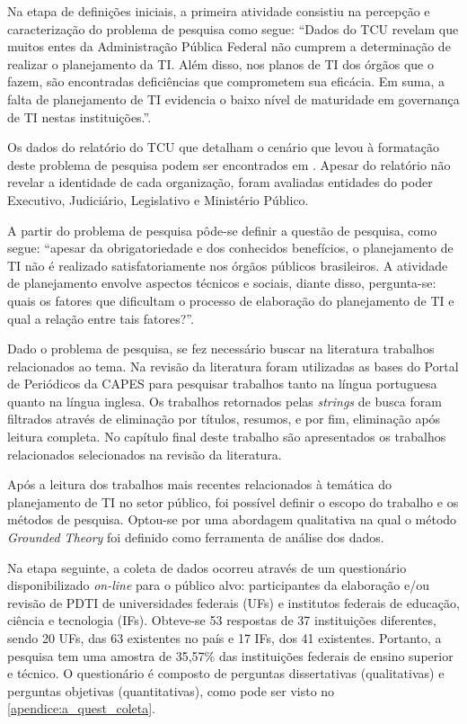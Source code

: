 Na etapa de definições iniciais, a primeira atividade consistiu na percepção e caracterização do problema de pesquisa como segue:
``Dados do TCU revelam que muitos entes da Administração Pública Federal não cumprem a determinação de realizar o planejamento da TI. Além disso, nos planos de TI dos órgãos que o fazem, são encontradas deficiências que comprometem sua eficácia. Em suma, a falta de planejamento de TI evidencia o baixo nível de maturidade em governança de TI nestas instituições.''.

Os dados do relatório do TCU que detalham o cenário que levou à formatação deste problema de pesquisa podem ser encontrados em . Apesar do relatório não revelar a identidade de cada organização, foram avaliadas entidades do poder Executivo, Judiciário, Legislativo e Ministério Público.

A partir do problema de pesquisa pôde-se definir a questão de pesquisa, como segue: ``apesar da obrigatoriedade e dos conhecidos benefícios, o planejamento de TI não é realizado satisfatoriamente nos órgãos públicos brasileiros. A atividade de planejamento envolve aspectos técnicos e sociais, diante disso, pergunta-se: quais os fatores que dificultam o processo de elaboração do planejamento de TI e qual a relação entre tais fatores?''.

Dado o problema de pesquisa, se fez necessário buscar na literatura trabalhos relacionados ao tema. Na revisão da literatura foram utilizadas as bases do Portal de Periódicos da CAPES para pesquisar trabalhos tanto na língua portuguesa quanto na língua inglesa. Os trabalhos retornados pelas \textit{strings} de busca foram filtrados através de eliminação por títulos, resumos, e por fim, eliminação após leitura completa. No capítulo final deste trabalho são apresentados os trabalhos relacionados selecionados na revisão da literatura.

Após a leitura dos trabalhos mais recentes relacionados à temática do planejamento de TI no setor público, foi possível definir o escopo do trabalho e os métodos de pesquisa. Optou-se por uma abordagem qualitativa na qual o método \textit{Grounded Theory} foi  definido como ferramenta de análise dos dados.

Na etapa seguinte, a coleta de dados ocorreu através de um questionário disponibilizado \textit{on-line} para o público alvo: participantes da elaboração e/ou revisão de PDTI de universidades federais (UFs) e institutos federais de educação, ciência e tecnologia (IFs). Obteve-se 53 respostas de 37 instituições diferentes, sendo 20 UFs, das 63 existentes no país e 17 IFs, dos 41 existentes. Portanto, a pesquisa tem uma amostra de 35,57\% das instituições federais de ensino superior e técnico. O questionário é composto de perguntas dissertativas (qualitativas) e perguntas objetivas (quantitativas), como pode ser visto no \autoref{apendice:a_quest_coleta}.


